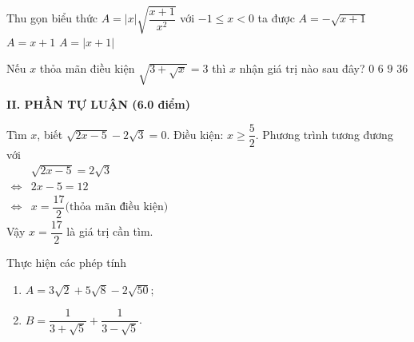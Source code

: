 \begin{bt}
	Thu gọn biểu thức $A=|x|\sqrt{\dfrac{x+1}{x^2}}$ với $-1\le x< 0$ ta được
	{$A=-\sqrt{x+1}$}
	{$A=x+1$}
	{$A=|x+1|$}
\end{bt}
\begin{bt}
	Nếu $x$ thỏa mãn điều kiện $\sqrt{3 + \sqrt{x}}  = 3$ thì $x$ nhận giá trị nào sau đây?
	\choice
	{$0$}
	{$6$}
	{$9$}
	{\True $36$}
\end{bt}
\noindent\textbf{II. PHẦN TỰ LUẬN (6.0 điểm)}
\begin{bt}
	Tìm $x$, biết $\sqrt{2x-5}-2\sqrt{3}=0$.
	\loigiai
	{Điều kiện: $x\ge \dfrac{5}{2}$. Phương trình tương đương với\\
		$\begin{aligned}
		&\sqrt{2x-5}=2\sqrt{3}\\
		\Leftrightarrow & 2x-5=12\\
		\Leftrightarrow & x=\dfrac{17}{2}\mbox{(thỏa mãn điều kiện)}
		\end{aligned}$\\
		Vậy $x=\dfrac{17}{2}$ là giá trị cần tìm.
	}
\end{bt}
\begin{bt}
	Thực hiện các phép tính
	\begin{enumerate}
		\item $A=3\sqrt{2}+5\sqrt{8}-2\sqrt{50}$;
		\item $B=\dfrac{1}{3+\sqrt{5}}+\dfrac{1}{3-\sqrt{5}}$.
	\end{enumerate}
\end{bt}
